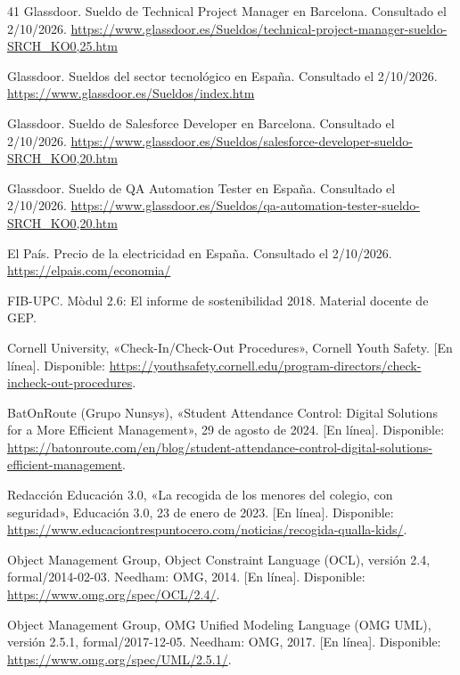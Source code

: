 \begin{thebibliography}{41}
 Glassdoor. Sueldo de Technical Project Manager en Barcelona. Consultado el 2/10/2026. \url{https://www.glassdoor.es/Sueldos/technical-project-manager-sueldo-SRCH_KO0,25.htm}

 Glassdoor. Sueldos del sector tecnológico en España. Consultado el 2/10/2026. \url{https://www.glassdoor.es/Sueldos/index.htm}

 Glassdoor. Sueldo de Salesforce Developer en Barcelona. Consultado el 2/10/2026. \url{https://www.glassdoor.es/Sueldos/salesforce-developer-sueldo-SRCH_KO0,20.htm}

 Glassdoor. Sueldo de QA Automation Tester en España. Consultado el 2/10/2026. \url{https://www.glassdoor.es/Sueldos/qa-automation-tester-sueldo-SRCH_KO0,20.htm}

 El País. Precio de la electricidad en España. Consultado el 2/10/2026. \url{https://elpais.com/economia/}

 FIB-UPC. Mòdul 2.6: El informe de sostenibilidad 2018. Material docente de GEP.

 Cornell University, «Check-In/Check-Out Procedures», Cornell Youth Safety. [En línea]. Disponible: \url{https://youthsafety.cornell.edu/program-directors/check-incheck-out-procedures}. 

 BatOnRoute (Grupo Nunsys), «Student Attendance Control: Digital Solutions for a More Efficient Management», 29 de agosto de 2024. [En línea]. Disponible: \url{https://batonroute.com/en/blog/student-attendance-control-digital-solutions-efficient-management}. 

 Redacción Educación 3.0, «La recogida de los menores del colegio, con seguridad», Educación 3.0, 23 de enero de 2023. [En línea]. Disponible: \url{https://www.educaciontrespuntocero.com/noticias/recogida-qualla-kids/}. 

 Object Management Group, Object Constraint Language (OCL), versión 2.4, formal/2014-02-03. Needham: OMG, 2014. [En línea]. Disponible: \url{https://www.omg.org/spec/OCL/2.4/}.

 Object Management Group, OMG Unified Modeling Language (OMG UML), versión 2.5.1, formal/2017-12-05. Needham: OMG, 2017. [En línea]. Disponible: \url{https://www.omg.org/spec/UML/2.5.1/}.


\end{thebibliography}
